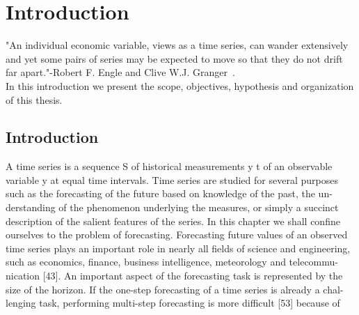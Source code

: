 \chapter{Introduction}\label{ch:introduction}

\vspace{0.5cm} 

"An individual economic variable, views as a time series, can wander extensively
and yet some pairs of series may be expected to move so that they do not drift
far apart."-Robert F. Engle and Clive W.J. Granger~\cite{engle1987}.\\
In this introduction we present the scope, objectives, hypothesis and organization of this thesis.


\section{Introduction}
A time series is a sequence S of historical measurements y t of an observable
variable y at equal time intervals. Time series are studied for several purposes
such as the forecasting of the future based on knowledge of the past, the un-
derstanding of the phenomenon underlying the measures, or simply a succinct
description of the salient features of the series. In this chapter we shall
confine
ourselves to the problem of forecasting. Forecasting future values of an
observed
time series plays an important role in nearly all fields of science and
engineering,
such as economics, finance, business intelligence, meteorology and telecommu-
nication [43]. An important aspect of the forecasting task is represented by the
size of the horizon. If the one-step forecasting of a time series is already a
chal-
lenging task, performing multi-step forecasting is more difficult [53] because
of

